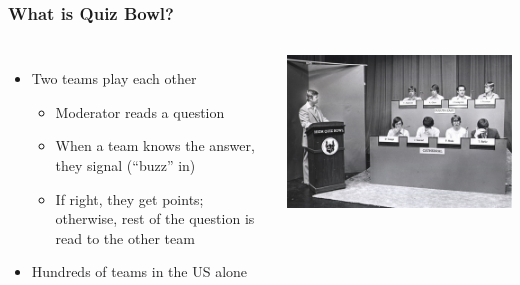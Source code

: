 \documentclass[xcolor=dvipsnames]{beamer}
\begin{document}
\begin{frame}
	\frametitle{What is Quiz Bowl?}
	\begin{columns}

	\begin{itemize}
		\item Two teams play each other
		\begin{itemize}
			\item Moderator reads a question
			\item When a team knows the answer, they signal (``buzz'' in)
			\item If right, they get points; otherwise, rest of the question is read to the other team
		\end{itemize}
		\item Hundreds of teams in the US alone
	\end{itemize}

	\includegraphics{qb/quizbowl}

	\end{columns}

\end{frame}
\end{document}
